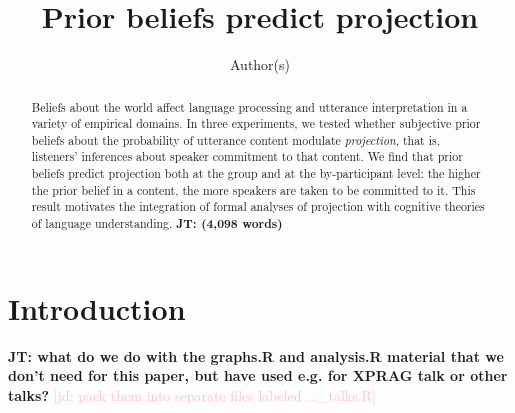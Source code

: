 \documentclass[11pt,fleqn]{article}
\title{Prior beliefs predict projection}
\author{Author(s)}
\newcommand{\jd}[1]{\textcolor{Pink}{[jd: #1]}}
\newcommand{\jt}[1]{\textbf{\color{blue}JT: #1}}
\newcommand{\6}{\mbox{$[\hspace*{-.6mm}[$}}
\newcommand{\9}{\mbox{$]\hspace*{-.6mm}]$}}
\begin{document}

\maketitle

\begin{abstract}

Beliefs about the world affect language processing and utterance interpretation in a variety of empirical domains. In three experiments, we tested whether subjective prior beliefs about the probability of utterance content modulate \emph{projection}, that is, listeners' inferences about speaker commitment to that content. We find that prior beliefs predict projection both at the group and at the by-participant level: the higher the prior belief in a content, the more speakers are taken to be committed to it. This result motivates the integration of formal analyses of projection with cognitive theories of language understanding.  \jt{(4,098 words)}

\end{abstract}


\section{Introduction}

\jt{what do we do with the graphs.R and analysis.R material that we don't need for this paper, but have used e.g. for XPRAG talk or other talks?} \jd{pack them into separate files labeled ...\_talks.R}
\end{document}
